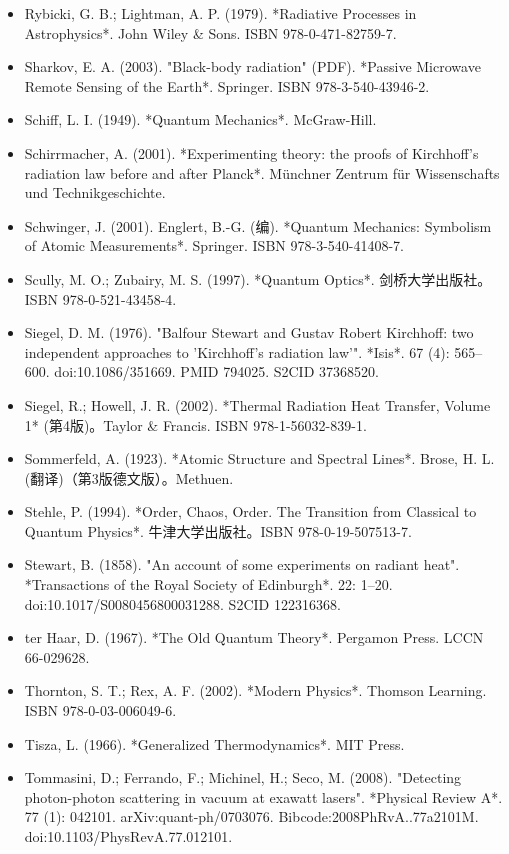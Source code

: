 \begin{itemize}
\item Rybicki, G. B.; Lightman, A. P. (1979). *Radiative Processes in Astrophysics*. John Wiley & Sons. ISBN 978-0-471-82759-7.  
\item Sharkov, E. A. (2003). "Black-body radiation" (PDF). *Passive Microwave Remote Sensing of the Earth*. Springer. ISBN 978-3-540-43946-2.  
\item Schiff, L. I. (1949). *Quantum Mechanics*. McGraw-Hill.  
\item Schirrmacher, A. (2001). *Experimenting theory: the proofs of Kirchhoff's radiation law before and after Planck*. Münchner Zentrum für Wissenschafts und Technikgeschichte.  
\item Schwinger, J. (2001). Englert, B.-G. (编). *Quantum Mechanics: Symbolism of Atomic Measurements*. Springer. ISBN 978-3-540-41408-7.  
\item Scully, M. O.; Zubairy, M. S. (1997). *Quantum Optics*. 剑桥大学出版社。ISBN 978-0-521-43458-4.
\item Siegel, D. M. (1976). "Balfour Stewart and Gustav Robert Kirchhoff: two independent approaches to 'Kirchhoff's radiation law'". *Isis*. 67 (4): 565–600. doi:10.1086/351669. PMID 794025. S2CID 37368520.  
\item Siegel, R.; Howell, J. R. (2002). *Thermal Radiation Heat Transfer, Volume 1* (第4版)。Taylor & Francis. ISBN 978-1-56032-839-1.  
\item Sommerfeld, A. (1923). *Atomic Structure and Spectral Lines*. Brose, H. L. (翻译)（第3版德文版）。Methuen.  
\item Stehle, P. (1994). *Order, Chaos, Order. The Transition from Classical to Quantum Physics*. 牛津大学出版社。ISBN 978-0-19-507513-7.  
\item Stewart, B. (1858). "An account of some experiments on radiant heat". *Transactions of the Royal Society of Edinburgh*. 22: 1–20. doi:10.1017/S0080456800031288. S2CID 122316368.  
\item ter Haar, D. (1967). *The Old Quantum Theory*. Pergamon Press. LCCN 66-029628.  
\item Thornton, S. T.; Rex, A. F. (2002). *Modern Physics*. Thomson Learning. ISBN 978-0-03-006049-6.  
\item Tisza, L. (1966). *Generalized Thermodynamics*. MIT Press.  
\item Tommasini, D.; Ferrando, F.; Michinel, H.; Seco, M. (2008). "Detecting photon-photon scattering in vacuum at exawatt lasers". *Physical Review A*. 77 (1): 042101. arXiv:quant-ph/0703076. Bibcode:2008PhRvA..77a2101M. doi:10.1103/PhysRevA.77.012101.  

\end{itemize}

